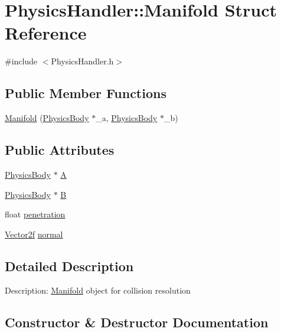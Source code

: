 \hypertarget{struct_physics_handler_1_1_manifold}{}\section{Physics\+Handler\+::Manifold Struct Reference}
\label{struct_physics_handler_1_1_manifold}


{\ttfamily \#include $<$Physics\+Handler.\+h$>$}

\subsection*{Public Member Functions}
\begin{DoxyCompactItemize}
\item 
\mbox{\hyperlink{struct_physics_handler_1_1_manifold_a7ffd7be2e2368326b14be6d36885d199}{Manifold}} (\mbox{\hyperlink{class_physics_body}{Physics\+Body}} $\ast$\+\_\+a, \mbox{\hyperlink{class_physics_body}{Physics\+Body}} $\ast$\+\_\+b)
\end{DoxyCompactItemize}
\subsection*{Public Attributes}
\begin{DoxyCompactItemize}
\item 
\mbox{\hyperlink{class_physics_body}{Physics\+Body}} $\ast$ \mbox{\hyperlink{struct_physics_handler_1_1_manifold_a7e3535928b9572d703e08a9b1c529310}{A}}
\item 
\mbox{\hyperlink{class_physics_body}{Physics\+Body}} $\ast$ \mbox{\hyperlink{struct_physics_handler_1_1_manifold_a511bae2c54dbf72741b37e54fface2b3}{B}}
\item 
float \mbox{\hyperlink{struct_physics_handler_1_1_manifold_a877e83b9027793d5e5a580be3d6b79aa}{penetration}}
\item 
\mbox{\hyperlink{class_vector2f}{Vector2f}} \mbox{\hyperlink{struct_physics_handler_1_1_manifold_a4f04c19ed5e3232f9f47ee4b9355c742}{normal}}
\end{DoxyCompactItemize}


\subsection{Detailed Description}
Description\+: \mbox{\hyperlink{struct_physics_handler_1_1_manifold}{Manifold}} object for collision resolution 

\subsection{Constructor \& Destructor Documentation}
\mbox{\label{struct_physics_handler_1_1_manifold_a7ffd7be2e2368326b14be6d36885d199}} 
